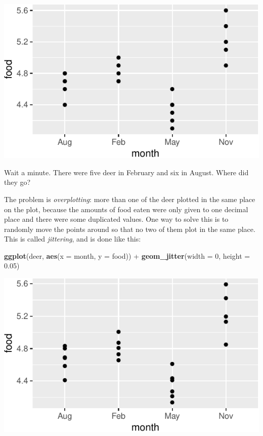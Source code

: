 \documentclass[]{tufte-book}
\newenvironment{Shaded}{}{}
\newcommand{\DataTypeTok}[1]{\textcolor[rgb]{0.56,0.13,0.00}{#1}}
\newcommand{\DecValTok}[1]{\textcolor[rgb]{0.25,0.63,0.44}{#1}}
\newcommand{\FloatTok}[1]{\textcolor[rgb]{0.25,0.63,0.44}{#1}}
\newcommand{\KeywordTok}[1]{\textcolor[rgb]{0.00,0.44,0.13}{\textbf{#1}}}
\newcommand{\NormalTok}[1]{#1}
\newcommand{\OperatorTok}[1]{\textcolor[rgb]{0.40,0.40,0.40}{#1}}
\newcommand{\StringTok}[1]{\textcolor[rgb]{0.25,0.44,0.63}{#1}}
\theoremstyle{definition}
\theoremstyle{definition}
\theoremstyle{definition}
\theoremstyle{remark}
\begin{document}
\includegraphics{10-analysis-of-variance_files/figure-latex/unnamed-chunk-13-1}

Wait a minute. There were five deer in February and six in August. Where
did they go?

The problem is \emph{overplotting}: more than one of the deer plotted in
the same place on the plot, because the amounts of food eaten were only
given to one decimal place and there were some duplicated values. One
way to solve this is to randomly move the points around so that no two
of them plot in the same place. This is called \emph{jittering}, and is
done like this:

\begin{Shaded}
\begin{Highlighting}[]
\KeywordTok{ggplot}\NormalTok{(deer, }\KeywordTok{aes}\NormalTok{(}\DataTypeTok{x =}\NormalTok{ month, }\DataTypeTok{y =}\NormalTok{ food)) }\OperatorTok{+}\StringTok{ }\KeywordTok{geom_jitter}\NormalTok{(}\DataTypeTok{width =} \DecValTok{0}\NormalTok{, }
    \DataTypeTok{height =} \FloatTok{0.05}\NormalTok{)}
\end{Highlighting}
\end{Shaded}

\includegraphics{10-analysis-of-variance_files/figure-latex/unnamed-chunk-14-1}
\end{document}
